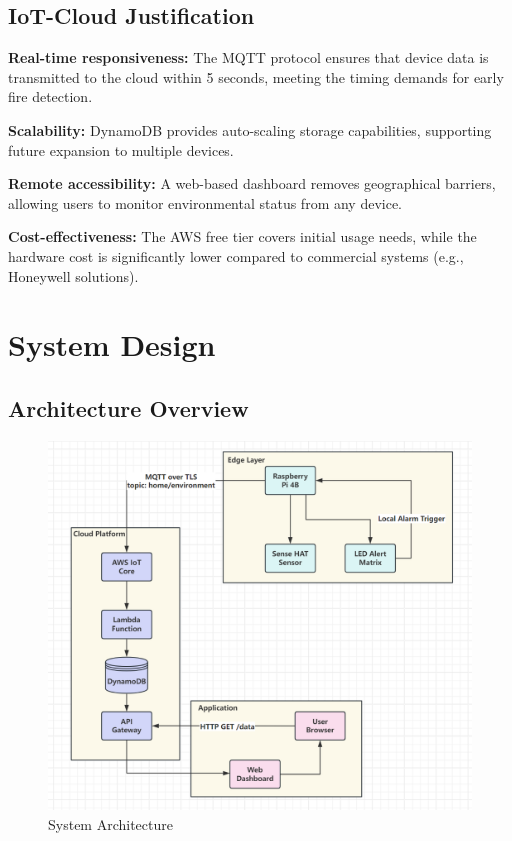 \documentclass[12pt,a4paper]{article}
\begin{document}
\subsection{IoT-Cloud Justification}

\noindent
\textbf{Real-time responsiveness:} The MQTT protocol ensures that device data is transmitted to the cloud within 5 seconds, meeting the timing demands for early fire detection.

\vspace{\baselineskip}
\noindent
\textbf{Scalability:} DynamoDB provides auto-scaling storage capabilities, supporting future expansion to multiple devices.

\vspace{\baselineskip}
\noindent
\textbf{Remote accessibility:} A web-based dashboard removes geographical barriers, allowing users to monitor environmental status from any device.

\vspace{\baselineskip}
\noindent
\textbf{Cost-effectiveness:} The AWS free tier covers initial usage needs, while the hardware cost is significantly lower compared to commercial systems (e.g., Honeywell solutions).

\vspace{\baselineskip}
\vspace{\baselineskip}
\vspace{\baselineskip}
\vspace{\baselineskip}
\vspace{\baselineskip}


\section{System Design}

\subsection{Architecture Overview}

\begin{figure}[h!]
    \centering
    \includegraphics[width=0.75\linewidth]{figures/systemStructure.png}
    \caption{System  Architecture}
\end{figure}
\end{document}
